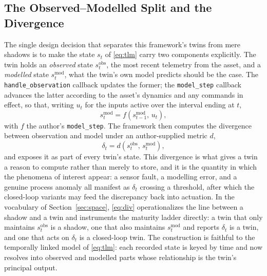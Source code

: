 \documentclass[conference]{IEEEtran}
\begin{document}
\subsection{The Observed--Modelled Split and the Divergence}
The single design decision that separates this framework's twins from mere
shadows is to make the state $s_t$ of \eqref{eq:tlm} carry two components
explicitly. The twin holds an \emph{observed} state $s_t^{\mathrm{obs}}$, the
most recent telemetry from the asset, and a \emph{modelled} state
$s_t^{\mathrm{mod}}$, what the twin's own model predicts should be the case. The
\texttt{handle\_observation} callback updates the former; the
\texttt{model\_step} callback advances the latter according to the asset's
dynamics and any commands in effect, so that, writing $u_t$ for the inputs
active over the interval ending at $t$,
\begin{equation}
\label{eq:model}
s_t^{\mathrm{mod}} = f\!\left(s_{t-1}^{\mathrm{mod}},\, u_t\right),
\end{equation}
with $f$ the author's \texttt{model\_step}. The framework then computes the
divergence between observation and model under an author-supplied metric $d$,
\begin{equation}
\label{eq:div}
\delta_t = d\!\left(s_t^{\mathrm{obs}},\, s_t^{\mathrm{mod}}\right),
\end{equation}
and exposes it as part of every twin's state. This divergence is what gives a
twin a reason to compute rather than merely to store, and it is the quantity in
which the phenomena of interest appear: a sensor fault, a modelling error, and a
genuine process anomaly all manifest as $\delta_t$ crossing a threshold, after
which the closed-loop variants may feed the discrepancy back into actuation. In
the vocabulary of Section~\ref{sec:space}, \eqref{eq:div} operationalizes the
line between a shadow and a twin and instruments the maturity ladder directly:
a twin that only maintains $s_t^{\mathrm{obs}}$ is a shadow, one that also
maintains $s_t^{\mathrm{mod}}$ and reports $\delta_t$ is a twin, and one that
acts on $\delta_t$ is a closed-loop twin. The construction is faithful to the
temporally linked model of \eqref{eq:tlm}: each recorded state is keyed by time
and now resolves into observed and modelled parts whose relationship is the
twin's principal output.
\end{document}
